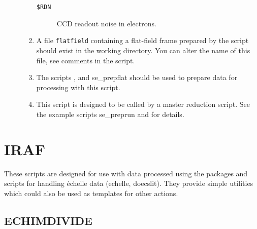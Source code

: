 \documentclass[twoside,11pt]{starlink}
\begin{document}
\begin{description}
\begin{enumerate}
\begin{description}
\item [{\tt{\$RDN}}]
      CCD readout noise in electrons.

\end{description}

\item A file \verb+flatfield+ containing a flat-field frame prepared by the
      script  should exist in the
      working directory.
      You can alter the name of this file, see comments in the
      script.

\item The scripts ,
       and 
      {se_prepflat} should be
      used to prepare data for processing with this script.

\item This script is designed to be called by a master reduction
      script.  See the example scripts 
      {se_preprun}
      and  for details.

\end{enumerate}
\end{description}


\newpage
\section{\label{se_iraf}IRAF}


These scripts are designed for use with data processed using the
packages and scripts for handling \'{e}chelle data (echelle, doecslit).
They provide simple utilities which could also be used as templates
for other actions.


\subsection{\label{se_echimdivide}ECHIMDIVIDE}
\end{document}
